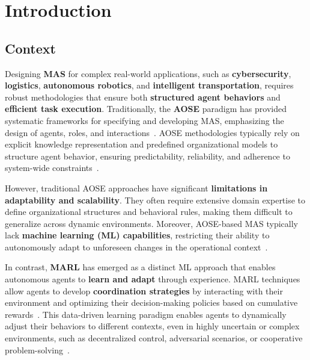 \documentclass[pdflatex,sn-mathphys-num]{sn-jnl}%
\theoremstyle{thmstyleone}%
\theoremstyle{thmstyletwo}%
\theoremstyle{thmstylethree}%
\begin{document}




\maketitle

\section{Introduction}

\subsection{Context}

Designing \textbf{MAS} for complex real-world applications, such as \textbf{cybersecurity}, \textbf{logistics}, \textbf{autonomous robotics}, and \textbf{intelligent transportation}, requires robust methodologies that ensure both \textbf{structured agent behaviors} and \textbf{efficient task execution}. Traditionally, the \textbf{AOSE} paradigm has provided systematic frameworks for specifying and developing MAS, emphasizing the design of agents, roles, and interactions~\cite{Pavon2003, Bernon2005}. AOSE methodologies typically rely on explicit knowledge representation and predefined organizational models to structure agent behavior, ensuring predictability, reliability, and adherence to system-wide constraints~\cite{Hindriks2014}.

However, traditional AOSE approaches have significant \textbf{limitations in adaptability and scalability}. They often require extensive domain expertise to define organizational structures and behavioral rules, making them difficult to generalize across dynamic environments. Moreover, AOSE-based MAS typically lack \textbf{machine learning (ML) capabilities}, restricting their ability to autonomously adapt to unforeseen changes in the operational context~\cite{Garcia2004}.

In contrast, \textbf{MARL} has emerged as a distinct ML approach that enables autonomous agents to \textbf{learn and adapt} through experience. MARL techniques allow agents to develop \textbf{coordination strategies} by interacting with their environment and optimizing their decision-making policies based on cumulative rewards~\cite{Zhang2021}. This data-driven learning paradigm enables agents to dynamically adjust their behaviors to different contexts, even in highly uncertain or complex environments, such as decentralized control, adversarial scenarios, or cooperative problem-solving~\cite{Papoudakis2021}.
\end{document}
